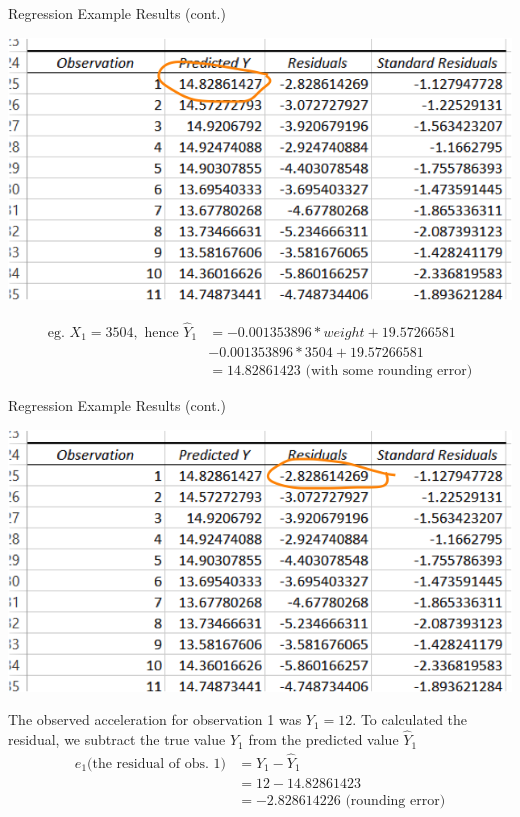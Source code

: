 \documentclass[xcolor=svgnames, handout]{beamer}
\begin{document}
\begin{frame}[label=current]{Regression Example Results (cont.)}
\begin{center}
\includegraphics[width=.75\textwidth]{RER1a}
\end{center}
\begin{align*}
\text{eg. }X_1=3504, \text{ hence } \hat Y_1 &= -0.001353896*weight + 19.57266581 \\
&-0.001353896*3504 + 19.57266581\\
& = 14.82861423 \text{ (with some rounding error)}
\end{align*}
\end{frame}


\begin{frame}[label=current]{Regression Example Results (cont.)}
\begin{center}
\includegraphics[width=.75\textwidth]{RER1b}
\end{center}
The observed acceleration for observation 1 was $Y_1=12$.  To calculated the residual, we subtract the true value $Y_1$ from the predicted value $\hat Y_1$
\begin{align*}
e_1 \text{(the residual of obs. 1)} &= Y_1 - \hat Y_1\\
&= 12 - 14.82861423 \\
& = -2.828614226 \text{ (rounding error)}
\end{align*}
\end{frame}
\end{document}
